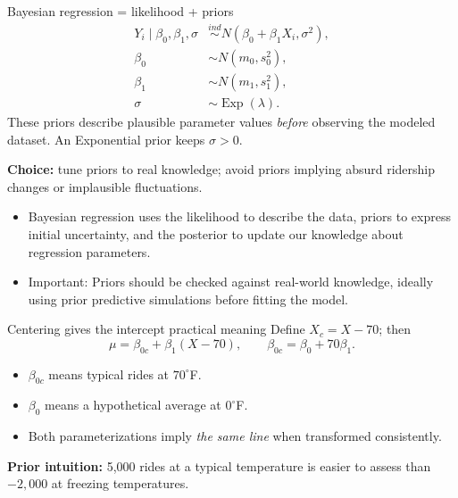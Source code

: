 \documentclass[aspectratio=43,11pt]{beamer}
\begin{document}
\begin{frame}{Bayesian regression = likelihood + priors}
\begin{align*}
Y_i\mid\beta_0,\beta_1,\sigma &\stackrel{ind}{\sim} N(\beta_0+\beta_1X_i,\sigma^2),\\
\beta_0&\sim N(m_0,s_0^2),\\
\beta_1&\sim N(m_1,s_1^2),\\
\sigma&\sim\operatorname{Exp}(\lambda).
\end{align*}
These priors describe plausible parameter values \emph{before} observing the modeled dataset. An Exponential prior keeps $\sigma>0$.
\par\medskip\textbf{Choice:} tune priors to real knowledge; avoid priors implying absurd ridership changes or implausible fluctuations.
\begin{itemize}
\item \footnotesize{Bayesian regression uses the likelihood to describe the data, priors to express initial uncertainty, and the posterior to update our knowledge about regression parameters.}
\item \footnotesize{Important: Priors should be checked against real-world knowledge, ideally using prior predictive simulations before fitting the model.}
\end{itemize}
\end{frame}

\begin{frame}{Centering gives the intercept practical meaning}
Define $X_c=X-70$; then
\[\mu=\beta_{0c}+\beta_1(X-70),\qquad \beta_{0c}=\beta_0+70\beta_1.\]

\begin{itemize}
\item $\beta_{0c}$ means typical rides at $70^\circ$F.
\item $\beta_0$ means a hypothetical average at $0^\circ$F.
\item Both parameterizations imply \emph{the same line} when transformed consistently.
\end{itemize}
\par\medskip
\textbf{Prior intuition:} 5,000 rides at a typical temperature is easier to assess than $-2,000$ at freezing temperatures.
\end{frame}
\end{document}
